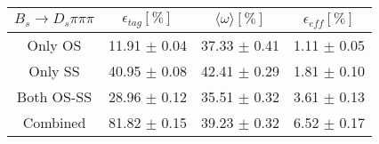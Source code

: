 \begin{tabular}{c c c c}
\hline
\hline
$ B_s \to D_s \pi \pi \pi$ & $\epsilon_{tag} [\%]$ & $\langle \omega \rangle [\%] $ & $\epsilon_{eff} [\%]$ \\
\hline
Only OS & 11.91 $\pm$ 0.04 & 37.33 $\pm$ 0.41 & 1.11 $\pm$ 0.05\\
Only SS & 40.95 $\pm$ 0.08 & 42.41 $\pm$ 0.29 & 1.81 $\pm$ 0.10\\
Both OS-SS & 28.96 $\pm$ 0.12 & 35.51 $\pm$ 0.32 & 3.61 $\pm$ 0.13\\
\hline
Combined & 81.82 $\pm$ 0.15 & 39.23 $\pm$ 0.32 & 6.52 $\pm$ 0.17\\
\hline
\hline
\end{tabular}
